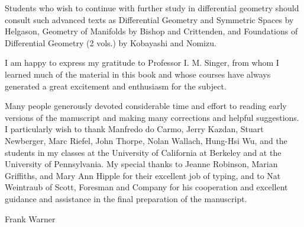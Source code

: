 Students who wish to continue with further study in differential geometry should consult such advanced texts as Differential Geometry and Symmetric Spaces by Helgason, Geometry of Manifolds by Bishop and Crittenden, and Foundations of Differential Geometry (2 vols.) by Kobayashi and Nomizu.

I am happy to express my gratitude to Professor I. M. Singer, from whom I learned much of the material in this book and whose courses have always generated a great excitement and enthusiasm for the subject.

Many people generously devoted considerable time and effort to reading early versions of the manuscript and making many corrections and helpful suggestions. I particularly wish to thank Manfredo do Carmo, Jerry Kazdan, Stuart Newberger, Marc Riefel, John Thorpe, Nolan Wallach, Hung-Hsi Wu, and the students in my classes at the University of California at Berkeley and at the University of Pennsylvania. My special thanks to Jeanne Robinson, Marian Griffiths, and Mary Ann Hipple for their excellent job of typing, and to Nat Weintraub of Scott, Foresman and Company for his cooperation and excellent guidance and assistance in the final preparation of the manuscript.

Frank Warner
